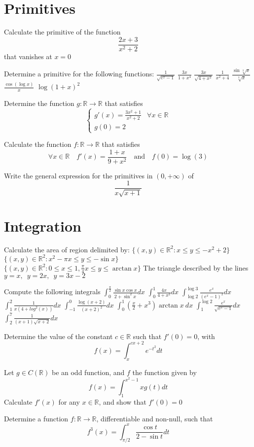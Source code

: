 \documentclass[12pt]{article}
\begin{document}
\section{Primitives}
\begin{ExerciseList}
	\Exercise Calculate the primitive of the function $$\frac{2x+3}{x^2+2}$$ that vanishes at $x=0$

	\Exercise Determine a primitive for the following functions:
	\Question $\frac{1}{\sqrt{e^x - 1}}$
	\Question $\frac{3x}{1+x^4}$
	\Question $\frac{3x}{\sqrt{4+x^2}}$
	\Question $\frac{1}{x^2+4}$
	\Question $\frac{\sin{\sqrt[3]{x}}}{\sqrt[3]{x}}$
	\Question $\frac{\cos(\log x)}{x}$
	\Question $\log(1+x)^2$

	\Exercise Determine the function $g\colon \mathbb R \to \mathbb R$ that satisfies
	$$\begin{cases}g'(x)=\frac{3x^2 + 1}{x^2 + 2} & \mbox{$\forall x\in \mathbb R$} \\ g(0)=2\end{cases}$$

	\Exercise Calculate the function $f\colon \mathbb R\to\mathbb R$ that satisfies
	$$\forall x\in\mathbb R\quad f'(x)=\frac{1+x}{9+x^2}\quad\mbox{and}\quad f(0)=\log(3)$$

	\Exercise Write the general expression for the primitives in $(0,+\infty)$ of
	$$\frac{1}{x\sqrt{x+1}}$$
\end{ExerciseList}

\section{Integration}
\begin{ExerciseList}
	\Exercise Calculate the area of region delimited by:
	\Question $\{(x,y)\in\mathbb R^2 \colon x\le y\le -x^2+2\}$
	\Question $\{ (x,y)\in\mathbb R^2 \colon x^2-\pi x\le y \le -\sin{x} \}$
	\Question $\{ (x,y)\in\mathbb R^2 \colon 0\le x\le 1,\frac{\pi}{4}x\le y\le\arctan x \}$
	\Question The triangle described by the lines $y=x,\enspace y=2x,\enspace y=3x-2$

	\Exercise Compute the following integrals
	\Question $\int_0^{\frac{\pi}{2}}\frac{\sin x \cos x}{2+\sin^2x}dx$
	\Question $\int_0^1{\frac{4x}{4+x^2}}dx$
	\Question $\int_{\log 2}^{\log 3}{\frac{e^x}{(e^x-1)^2}}dx$
	\Question $\int_1^2{\frac{1}{x(4+log^2(x))}}dx$
	\Question $\int_{-1}^0\frac{\log(x+2)}{(x+2)^2}dx$
	\Question $\int_0^1{(\frac{x}{2}+x^3)\arctan{x}}\: dx$
	\Question $\int_1^{\log{2}}{\frac{e^x}{\sqrt{e^x - 1}}}dx$
	\Question $\int_2^7{\frac{1}{(x+1)\sqrt{x+2}}}dx$

	\Exercise Determine the value of the constant $c\in\mathbb R$ such that $f'(0) = 0$, with
	$$f(x)=\int_x^{cx+2}{e^{-t^2}}dt$$

	\Exercise Let $g\in C(\mathbb R)$ be an odd function, and $f$ the function given by
	$$f(x)=\int_1^{x^2-1}{xg(t)}dt$$
	Calculate $f'(x)$ for any $x\in\mathbb R$, and show that $f'(0)=0$

	\Exercise Determine a function $f\colon\mathbb R \to \mathbb R$, differentiable and non-null, such that
	$$f^3(x)=\int_{\pi/2}^{x}{\frac{\cos{t}}{2-\sin{t}}}dt$$

\end{ExerciseList}
\end{document}
